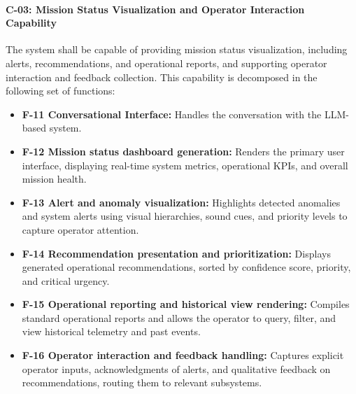 \paragraph{C-03: Mission Status Visualization and Operator Interaction Capability}
The system shall be capable of providing mission status visualization, including alerts, recommendations, and operational reports, and supporting operator interaction and feedback collection. This capability is decomposed in the following set of functions:
\begin{itemize}
    \item \textbf{F-11 Conversational Interface:} Handles the conversation with the LLM-based system.
    \item \textbf{F-12 Mission status dashboard generation:} Renders the primary user interface, displaying real-time system metrics, operational KPIs, and overall mission health.
    \item \textbf{F-13 Alert and anomaly visualization:} Highlights detected anomalies and system alerts using visual hierarchies, sound cues, and priority levels to capture operator attention.
    \item \textbf{F-14 Recommendation presentation and prioritization:} Displays generated operational recommendations, sorted by confidence score, priority, and critical urgency.
    \item \textbf{F-15 Operational reporting and historical view rendering:} Compiles standard operational reports and allows the operator to query, filter, and view historical telemetry and past events.
    \item \textbf{F-16 Operator interaction and feedback handling:} Captures explicit operator inputs, acknowledgments of alerts, and qualitative feedback on recommendations, routing them to relevant subsystems.
\end{itemize}

